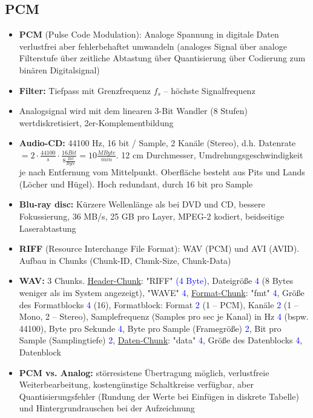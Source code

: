 \documentclass[12pt,landscape]{article}
\begin{document}
\begin{multicols}{3}
\subsection{PCM}
\begin{itemize}
\item \textbf{PCM} (Pulse Code Modulation): Analoge Spannung in digitale Daten verlustfrei aber fehlerbehaftet umwandeln (analoges Signal über analoge Filterstufe über zeitliche Abtastung über Quantisierung über Codierung zum binären Digitalsignal)
\item \textbf{Filter:} Tiefpass mit Grenzfrequenz $f_s$ -- höchste Signalfrequenz
\item Analogsignal wird mit dem linearen 3-Bit Wandler (8 Stufen) wertdiskretisiert, 2er-Komplementbildung
\item \textbf{Audio-CD:} 44100 Hz, 16 bit / Sample, 2 Kanäle (Stereo), d.h. Datenrate $=2\cdot\frac{44100}{s}\cdot\frac{16 Bit}{8\frac{Bit}{Byte}}=10\frac{MByte}{min}$. 12 cm Durchmesser, Umdrehungsgeschwindigkeit je nach Entfernung vom Mittelpunkt. Oberfläche besteht aus Pits und Lands (Löcher und Hügel). Hoch redundant, durch 16 bit pro Sample
\item \textbf{Blu-ray disc:} Kürzere Wellenlänge als bei DVD und CD, bessere Fokussierung, 36 MB/s, 25 GB pro Layer, MPEG-2 kodiert, beidseitige Laserabtastung
\item \textbf{RIFF} (Resource Interchange File Format): WAV (PCM) und AVI (AVID). Aufbau in Chunks (Chunk-ID, Chunk-Size, Chunk-Data)
\item \textbf{WAV:} 3 Chunks. \underline{Header-Chunk}: "RIFF" \textcolor{blue}{(4 Byte)}, Dateigröße \textcolor{blue}{4} (8 Bytes weniger als im System angezeigt), "WAVE" \textcolor{blue}{4}, \underline{Format-Chunk}: "fmt" \textcolor{blue}{4}, Größe des Formatblocks \textcolor{blue}{4} (16), Formatblock: Format \textcolor{blue}{2} (1 -- PCM), Kanäle \textcolor{blue}{2} (1 -- Mono, 2 -- Stereo), Samplefrequenz (Samples pro sec je Kanal) in Hz \textcolor{blue}{4} (bspw. 44100), Byte pro Sekunde \textcolor{blue}{4}, Byte pro Sample (Framegröße) \textcolor{blue}{2}, Bit pro Sample (Samplingtiefe) \textcolor{blue}{2}, \underline{Daten-Chunk}: "data" \textcolor{blue}{4}, Größe des Datenblocks \textcolor{blue}{4}, Datenblock
\item \textbf{PCM vs. Analog:} störresistene Übertragung möglich, verlustfreie Weiterbearbeitung, kostengünstige Schaltkreise verfügbar, aber Quantisierungsfehler (Rundung der Werte bei Einfügen in diskrete Tabelle) und Hintergrundrauschen bei der Aufzeichnung

\end{itemize}
\end{multicols}
\end{document}
